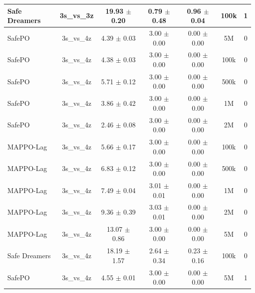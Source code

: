 \begin{longtable}{lcccccc}
Safe Dreamers & 3s\_vs\_3z & 19.93 $\pm$ 0.20 & 0.79 $\pm$ 0.48 & 0.96 $\pm$ 0.04 & 100k & 1 \\
\midrule
SafePO & 3s\_vs\_4z & \textcolor{green!60!black}{4.39 $\pm$ 0.03} & \textcolor{green!60!black}{3.00 $\pm$ 0.00} & \textcolor{green!60!black}{0.00 $\pm$ 0.00} & 5M & 0 \\
SafePO & 3s\_vs\_4z & \textcolor{green!60!black}{4.38 $\pm$ 0.03} & \textcolor{green!60!black}{3.00 $\pm$ 0.00} & \textcolor{green!60!black}{0.00 $\pm$ 0.00} & 100k & 0 \\
SafePO & 3s\_vs\_4z & \textcolor{green!60!black}{5.71 $\pm$ 0.12} & \textcolor{green!60!black}{3.00 $\pm$ 0.00} & \textcolor{green!60!black}{0.00 $\pm$ 0.00} & 500k & 0 \\
SafePO & 3s\_vs\_4z & \textcolor{green!60!black}{3.86 $\pm$ 0.42} & \textcolor{green!60!black}{3.00 $\pm$ 0.00} & \textcolor{green!60!black}{0.00 $\pm$ 0.00} & 1M & 0 \\
SafePO & 3s\_vs\_4z & \textcolor{green!60!black}{2.46 $\pm$ 0.08} & \textcolor{green!60!black}{3.00 $\pm$ 0.00} & \textcolor{green!60!black}{0.00 $\pm$ 0.00} & 2M & 0 \\
MAPPO-Lag & 3s\_vs\_4z & \textcolor{green!60!black}{5.66 $\pm$ 0.17} & \textcolor{green!60!black}{3.00 $\pm$ 0.00} & \textcolor{green!60!black}{0.00 $\pm$ 0.00} & 100k & 0 \\
MAPPO-Lag & 3s\_vs\_4z & \textcolor{green!60!black}{6.83 $\pm$ 0.12} & \textcolor{green!60!black}{3.00 $\pm$ 0.00} & \textcolor{green!60!black}{0.00 $\pm$ 0.00} & 500k & 0 \\
MAPPO-Lag & 3s\_vs\_4z & \textcolor{green!60!black}{7.49 $\pm$ 0.04} & \textcolor{green!60!black}{3.01 $\pm$ 0.01} & \textcolor{green!60!black}{0.00 $\pm$ 0.00} & 1M & 0 \\
MAPPO-Lag & 3s\_vs\_4z & \textcolor{green!60!black}{9.36 $\pm$ 0.39} & \textcolor{green!60!black}{3.03 $\pm$ 0.01} & \textcolor{green!60!black}{0.00 $\pm$ 0.00} & 2M & 0 \\
MAPPO-Lag & 3s\_vs\_4z & \textcolor{green!60!black}{13.07 $\pm$ 0.86} & \textcolor{green!60!black}{3.00 $\pm$ 0.00} & \textcolor{green!60!black}{0.00 $\pm$ 0.00} & 5M & 0 \\
Safe Dreamers & 3s\_vs\_4z & 18.19 $\pm$ 1.57 & 2.64 $\pm$ 0.34 & 0.23 $\pm$ 0.16 & 100k & 0 \\
\midrule
SafePO & 3s\_vs\_4z & \textcolor{green!60!black}{4.55 $\pm$ 0.01} & \textcolor{green!60!black}{3.00 $\pm$ 0.00} & \textcolor{green!60!black}{0.00 $\pm$ 0.00} & 5M & 1 \\

\end{longtable}

